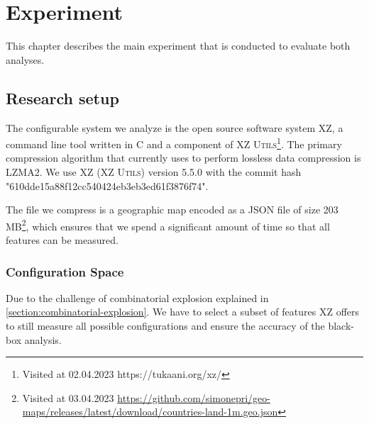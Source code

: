 \chapter{Experiment}\label{ch:experiment}

This chapter describes the main experiment that is conducted to evaluate both analyses.



\section{Research setup}\label{ch:Research-setup}

The configurable system we analyze is the open source software system \textsc{XZ}, a command line tool written in \textsc{C} and a component of
\textsc{XZ Utils}\footnote{Visited at 02.04.2023 https://tukaani.org/xz/}.  
The primary compression algorithm that  currently uses to perform lossless data compression is LZMA2.
We use \textsc{XZ} \textsc{(XZ Utils)} version 5.5.0 with the commit hash "610dde15a88f12cc540424eb3eb3ed61f3876f74".

The file we compress is a geographic map encoded as a \textsc{JSON} file of size 203 MB\footnote{Visited at 03.04.2023 \url{https://github.com/simonepri/geo-maps/releases/latest/download/countries-land-1m.geo.json}},
which ensures that we spend a significant amount of time so that all features can be measured.

\subsection{Configuration Space}
Due to the challenge of combinatorial explosion explained in \autoref{section:combinatorial-explosion}.
We have to select a subset of features \textsc{XZ} offers to still measure all possible configurations and ensure the accuracy of the black-box analysis. 


